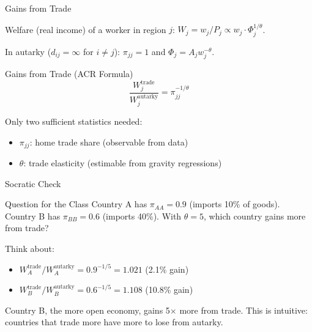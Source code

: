 \documentclass{beamer}
\begin{document}
\begin{frame}{Gains from Trade}

    Welfare (real income) of a worker in region $j$: $W_j = w_j/P_j \propto w_j \cdot \Phi_j^{1/\theta}$.

    \vspace{0.2em}
    In autarky ($d_{ij} = \infty$ for $i \neq j$): $\pi_{jj} = 1$ and $\Phi_j = A_j w_j^{-\theta}$.

    \vspace{0.2em}
    \begin{block}{Gains from Trade (ACR Formula)}
        \vspace{-0.5em}
        \[ \frac{W_j^{\text{trade}}}{W_j^{\text{autarky}}} = \pi_{jj}^{-1/\theta} \]
    \end{block}

    \vspace{0.2em}
     Only two sufficient statistics needed:
    \begin{itemize}
        \item $\pi_{jj}$: home trade share (observable from data)
        \item $\theta$: trade elasticity (estimable from gravity regressions)
    \end{itemize}

    \vspace{0.2em}

\end{frame}

\begin{frame}{Socratic Check}

    \begin{block}{Question for the Class}
        Country A has $\pi_{AA} = 0.9$ (imports 10\% of goods). Country B has $\pi_{BB} = 0.6$ (imports 40\%). With $\theta = 5$, which country gains more from trade?
    \end{block}

    \vspace{1em}
    Think about:
    \begin{itemize}
        \item $W_A^{\text{trade}}/W_A^{\text{autarky}} = 0.9^{-1/5} = 1.021$ \quad (2.1\% gain)
        \item $W_B^{\text{trade}}/W_B^{\text{autarky}} = 0.6^{-1/5} = 1.108$ \quad (10.8\% gain)
    \end{itemize}

    \vspace{0.5em}
     Country B, the more open economy, gains 5$\times$ more from trade. This is intuitive: countries that trade more have more to lose from autarky.

\end{frame}
\end{document}
